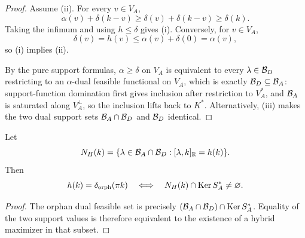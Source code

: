 \begin{proof}
Assume (ii).  For every \(v\in V_A\),
\[
 \alpha(v)+\delta(k-v)
 \ge\delta(v)+\delta(k-v)
 \ge\delta(k).
\]
Taking the infimum and using \(h\le\delta\) gives (i).
Conversely, for \(v\in V_A\),
\[
 \delta(v)=h(v)\le\alpha(v)+\delta(0)=\alpha(v),
\]
so (i) implies (ii).

By the pure support formulas, \(\alpha\ge\delta\) on \(V_A\) is
equivalent to every \(\lambda\in\mathcal B_D\) restricting to an
\(\alpha\)-dual feasible functional on \(V_A\), which is exactly
\(\mathcal B_D\subseteq\mathcal B_A\): support-function domination first gives
inclusion after restriction to \(V_A^*\), and \(\mathcal B_A\) is saturated
along \(V_A^\perp\), so the inclusion lifts back to \(K^*\).
Alternatively, (iii) makes the two dual support sets
\(\mathcal B_A\cap\mathcal B_D\) and \(\mathcal B_D\) identical.
\end{proof}

\begin{proposition}\label{prop:floor-equality}
Let
\[
 N_H(k)=
 \{\lambda\in\mathcal B_A\cap\mathcal B_D:
   [\lambda,k]_{\mathbb R}=h(k)\}.
\]
Then
\[
 h(k)=\delta_{\rm orph}(\pi k)
 \quad\Longleftrightarrow\quad
 N_H(k)\cap\operatorname{Ker} S_A^*\ne\varnothing.
\]
\end{proposition}

\begin{proof}
The orphan dual feasible set is precisely
\((\mathcal B_A\cap\mathcal B_D)\cap\operatorname{Ker} S_A^*\).  Equality of the two support values
is therefore equivalent to the existence of a hybrid maximizer in that
subset.
\end{proof}
